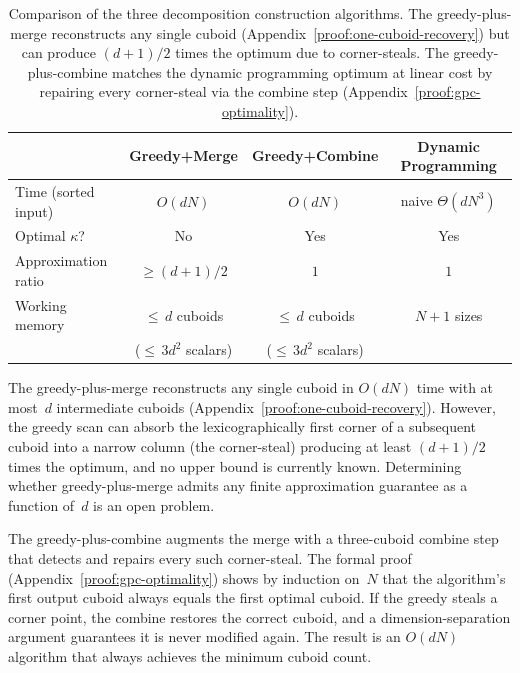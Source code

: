 \documentclass[manuscript,screen,review]{acmart}
\theoremstyle{definition}
\theoremstyle{plain}
\begin{document}
\begin{table}[ht]
\centering
\begin{tabular}{lccc}
\toprule
 & Greedy+Merge & Greedy+Combine & Dynamic Programming \\
\midrule
Time (sorted input) & $O(dN)$ & $O(dN)$ & naive $\Theta(dN^3)$ \\
Optimal $\kappa$? & No & Yes & Yes \\
Approximation ratio & $\geq (d{+}1)/2$ & $1$ & $1$ \\
Working memory & ${\leq}\,d$ cuboids & ${\leq}\,d$ cuboids & $N{+}1$ sizes \\
               & (${\leq}\,3d^2$ scalars) & (${\leq}\,3d^2$ scalars) & \\
\bottomrule
\end{tabular}
\caption{Comparison of the three decomposition construction algorithms.  The greedy-plus-merge reconstructs any single cuboid (Appendix~\ref{proof:one-cuboid-recovery}) but can produce $(d{+}1)/2$ times the optimum due to corner-steals.  The greedy-plus-combine matches the dynamic programming optimum at linear cost by repairing every corner-steal via the combine step (Appendix~\ref{proof:gpc-optimality}).}
\label{table:algorithm-comparison}
\end{table}

The greedy-plus-merge reconstructs any single cuboid in $O(dN)$ time
with at most~$d$ intermediate cuboids
(Appendix~\ref{proof:one-cuboid-recovery}).  However, the greedy scan
can absorb the lexicographically first corner of a subsequent cuboid
into a narrow column (the corner-steal) producing at least $(d{+}1)/2$
times the optimum, and no upper bound is currently known. Determining
whether greedy-plus-merge admits any finite approximation guarantee as
a function of~$d$ is an open problem.

The greedy-plus-combine augments the merge with a three-cuboid combine step that detects and repairs every such corner-steal.  The formal proof (Appendix~\ref{proof:gpc-optimality}) shows by induction on~$N$ that the algorithm's first output cuboid always equals the first optimal cuboid.  If the greedy steals a corner point, the combine restores the correct cuboid, and a dimension-separation argument guarantees it is never modified again.  The result is an $O(dN)$ algorithm that always achieves the minimum cuboid count.
\end{document}

